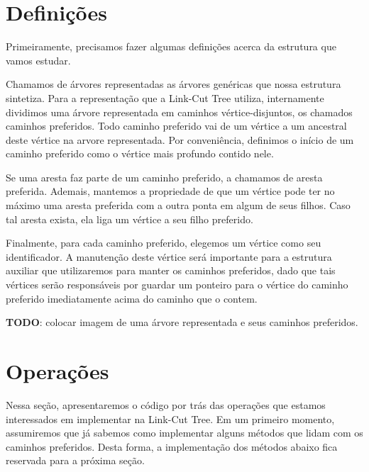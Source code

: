 \section{Definições}
\label{sec:lct-definicoes}

Primeiramente, precisamos fazer algumas definições acerca da estrutura que vamos estudar.

Chamamos de árvores representadas as árvores genéricas que nossa estrutura sintetiza. Para a representação que a Link-Cut Tree utiliza, internamente dividimos uma árvore representada em caminhos vértice-disjuntos, os chamados caminhos preferidos. Todo caminho preferido vai de um vértice a um ancestral deste vértice na arvore representada. Por conveniência, definimos o início de um caminho preferido como o vértice mais profundo contido nele.

Se uma aresta faz parte de um caminho preferido, a chamamos de aresta preferida. Ademais, mantemos a propriedade de que um vértice pode ter no máximo uma aresta preferida com a outra ponta em algum de seus filhos. Caso tal aresta exista, ela liga um vértice a seu filho preferido.

Finalmente, para cada caminho preferido, elegemos um vértice como seu identificador. A manutenção deste vértice será importante para a estrutura auxiliar que utilizaremos para manter os caminhos preferidos, dado que tais vértices serão responsáveis por guardar um ponteiro para o vértice do caminho preferido imediatamente acima do caminho que o contem.

\begin{center}
    \textbf{TODO}: colocar imagem de uma árvore representada e seus caminhos preferidos.
\end{center}

\section{Operações}
\label{sec:lct-operacoes}

Nessa seção, apresentaremos o código por trás das operações que estamos interessados em implementar na Link-Cut Tree. Em um primeiro momento, assumiremos que já sabemos como implementar alguns métodos que lidam com os caminhos preferidos. Desta forma, a implementação dos métodos abaixo fica reservada para a próxima seção.

